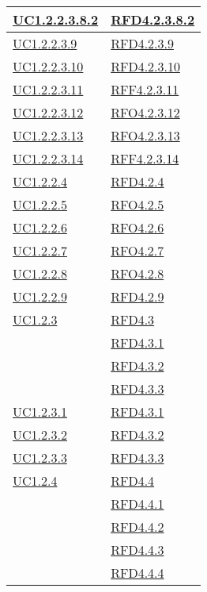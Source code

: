 \begin{longtable}{|>{\centering}m{5cm}|m{5cm}<{\centering}|}
\hyperref[UC1.2.2.3.8.2]{UC1.2.2.3.8.2} & \hyperlink{RFD4.2.3.8.2}{RFD4.2.3.8.2}\\ \hline
\hyperref[UC1.2.2.3.9]{UC1.2.2.3.9} & \hyperlink{RFD4.2.3.9}{RFD4.2.3.9}\\ \hline
\hyperref[UC1.2.2.3.10]{UC1.2.2.3.10} & \hyperlink{RFD4.2.3.10}{RFD4.2.3.10}\\ \hline
\hyperref[UC1.2.2.3.11]{UC1.2.2.3.11} & \hyperlink{RFF4.2.3.11}{RFF4.2.3.11}\\ \hline
\hyperref[UC1.2.2.3.12]{UC1.2.2.3.12} & \hyperlink{RFO4.2.3.12}{RFO4.2.3.12}\\ \hline
\hyperref[UC1.2.2.3.13]{UC1.2.2.3.13} & \hyperlink{RFO4.2.3.13}{RFO4.2.3.13}\\ \hline
\hyperref[UC1.2.2.3.14]{UC1.2.2.3.14} & \hyperlink{RFF4.2.3.14}{RFF4.2.3.14}\\ \hline
\hyperref[UC1.2.2.4]{UC1.2.2.4} & \hyperlink{RFD4.2.4}{RFD4.2.4}\\ \hline
\hyperref[UC1.2.2.5]{UC1.2.2.5} & \hyperlink{RFO4.2.5}{RFO4.2.5}\\ \hline
\hyperref[UC1.2.2.6]{UC1.2.2.6} & \hyperlink{RFO4.2.6}{RFO4.2.6}\\ \hline
\hyperref[UC1.2.2.7]{UC1.2.2.7} & \hyperlink{RFO4.2.7}{RFO4.2.7}\\ \hline
\hyperref[UC1.2.2.8]{UC1.2.2.8} & \hyperlink{RFO4.2.8}{RFO4.2.8}\\ \hline
\hyperref[UC1.2.2.9]{UC1.2.2.9} & \hyperlink{RFD4.2.9}{RFD4.2.9}\\ \hline
\hyperref[UC1.2.3]{UC1.2.3} & \hyperlink{RFD4.3}{RFD4.3}\\
& \hyperlink{RFD4.3.1}{RFD4.3.1}\\
& \hyperlink{RFD4.3.2}{RFD4.3.2}\\
& \hyperlink{RFD4.3.3}{RFD4.3.3}\\ \hline
\hyperref[UC1.2.3.1]{UC1.2.3.1} & \hyperlink{RFD4.3.1}{RFD4.3.1}\\ \hline
\hyperref[UC1.2.3.2]{UC1.2.3.2} & \hyperlink{RFD4.3.2}{RFD4.3.2}\\ \hline
\hyperref[UC1.2.3.3]{UC1.2.3.3} & \hyperlink{RFD4.3.3}{RFD4.3.3}\\ \hline
\hyperref[UC1.2.4]{UC1.2.4} & \hyperlink{RFD4.4}{RFD4.4}\\
& \hyperlink{RFD4.4.1}{RFD4.4.1}\\
& \hyperlink{RFD4.4.2}{RFD4.4.2}\\
& \hyperlink{RFD4.4.3}{RFD4.4.3}\\
& \hyperlink{RFD4.4.4}{RFD4.4.4}\\

\end{longtable}

